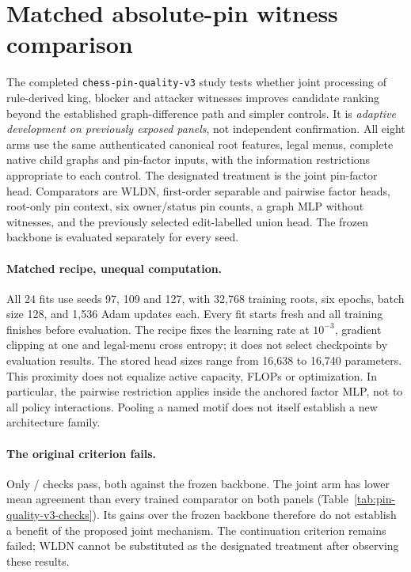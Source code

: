 \FloatBarrier
\section{Matched absolute-pin witness comparison}
\label{app:pin-quality-v3}
The completed \texttt{chess-pin-quality-v3} study tests whether joint processing
of rule-derived king, blocker and attacker witnesses improves candidate ranking
beyond the established graph-difference path and simpler controls. It is
\emph{adaptive development on previously exposed panels}, not independent
confirmation. All eight arms use the same authenticated canonical root features,
legal menus, complete native child graphs and pin-factor inputs, with the
information restrictions appropriate to each control. The designated treatment
is the joint pin-factor head. Comparators are WLDN, first-order separable and
pairwise factor heads, root-only pin context, six owner/status pin counts, a
graph MLP without witnesses, and the previously selected edit-labelled union
head. The frozen backbone is evaluated separately for every seed.

\paragraph{Matched recipe, unequal computation.}
All 24 fits use seeds 97, 109 and 127, with 32,768 training roots, six epochs,
batch size 128, and 1,536 Adam updates each. Every fit starts fresh and all
training finishes before evaluation. The recipe fixes the learning rate at
$10^{-3}$, gradient clipping at one and legal-menu cross entropy; it does not
select checkpoints by evaluation results. The stored head sizes range from
16,638 to 16,740 parameters. This proximity does not equalize active capacity,
FLOPs or optimization. In particular, the pairwise restriction applies inside
the anchored factor MLP, not to all policy interactions. Pooling a named motif
does not itself establish a new architecture family.



\paragraph{The original criterion fails.}
Only \PinQualityChecksPassed{}/\PinQualityChecksTotal{} checks pass, both against
the frozen backbone. The joint arm has lower mean agreement than every trained
comparator on both panels (Table~\ref{tab:pin-quality-v3-checks}). Its gains over
the frozen backbone therefore do not establish a benefit of the proposed
joint mechanism. The continuation criterion remains failed; WLDN cannot be
substituted as the designated treatment after observing these results.

